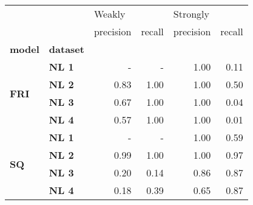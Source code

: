 \begin{tabular}{llrrrr}
\toprule
   &      & \multicolumn{2}{l}{Weakly} & \multicolumn{2}{l}{Strongly} \\
   &      & precision & recall & precision & recall \\
\textbf{model} & \textbf{dataset} &           &        &           &        \\
\midrule
\multirow{4}{*}{\textbf{FRI}} & \textbf{NL 1} &         - &      - &      1.00 &   0.11 \\
   & \textbf{NL 2} &      0.83 &   1.00 &      1.00 &   0.50 \\
   & \textbf{NL 3} &      0.67 &   1.00 &      1.00 &   0.04 \\
   & \textbf{NL 4} &      0.57 &   1.00 &      1.00 &   0.01 \\
\cline{1-6}
\multirow{4}{*}{\textbf{SQ}} & \textbf{NL 1} &         - &      - &      1.00 &   0.59 \\
   & \textbf{NL 2} &      0.99 &   1.00 &      1.00 &   0.97 \\
   & \textbf{NL 3} &      0.20 &   0.14 &      0.86 &   0.87 \\
   & \textbf{NL 4} &      0.18 &   0.39 &      0.65 &   0.87 \\
\bottomrule
\end{tabular}

